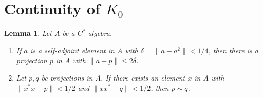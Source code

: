 \documentclass{book}
\newtheorem{lemma}[definition]{Lemma}
\def\cstar{\(C^*\)-algebra}
\begin{document}
\section{Continuity of \texorpdfstring{\(K_0\)}{K0}}
\begin{lemma}\label{lemma:Lars631}
  Let \(A\) be a \cstar.
  \begin{enumerate}
    \item If \(a\) is a self-adjoint element in \(A\) with \(\delta=\|a-a^2\|<1/4\), then there is 
      a projection \(p\) in \(A\) with \(\|a-p\|\leq2\delta\).
    \item Let \(p,q\) be projections in \(A\). If there exists an element \(x\) in \(A\) with
      \(\|x^*x-p\|<1/2\) and \(\|xx^*-q\|<1/2\), then \(p\sim q\).
  \end{enumerate}
\end{lemma}
\end{document}
